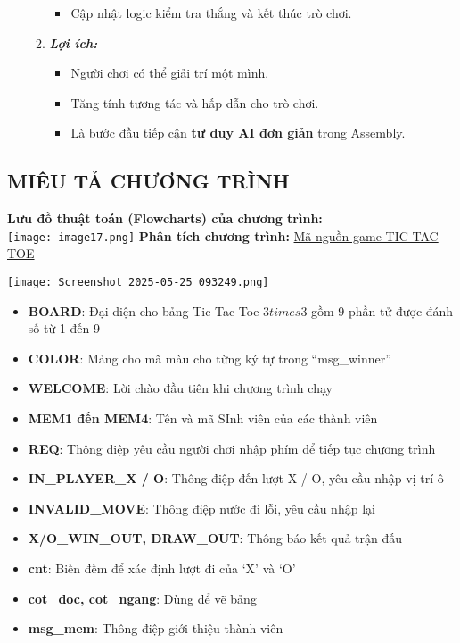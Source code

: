 \begin{enumerate}
\begin{enumerate}[label=\alph*]
\begin{itemize}
            \item Cập nhật logic kiểm tra thắng và kết thúc trò chơi.
        \end{itemize} 
        \item \textbf{\textit{Lợi ích:}}
        \begin{itemize}
            \item Người chơi có thể giải trí một mình.
            \item Tăng tính tương tác và hấp dẫn cho trò chơi.
            \item Là bước đầu tiếp cận \textbf{tư duy AI đơn giản} trong Assembly.
        \end{itemize}         
    \end{enumerate}
\end{enumerate}


\subsection*{\textbf{\large MIÊU TẢ CHƯƠNG TRÌNH}}

\textbf{Lưu đồ thuật toán (Flowcharts) của chương trình:}\\
\texttt{[image: image17.png]}
\textbf{Phân tích chương trình: }\href{https://ideone.com/sVtGtK}{Mã nguồn game TIC TAC TOE}

\texttt{[image: Screenshot 2025-05-25 093249.png]}
\begin{itemize}
    \item \textbf{BOARD}: Đại diện cho bảng Tic Tac Toe 3$times$3 gồm 9 phần tử được đánh số từ 1 đến 9 
    \item \textbf{COLOR}: Mảng cho mã màu cho từng ký tự trong “msg\_winner” 
    \item \textbf{WELCOME}: Lời chào đầu tiên khi chương trình chạy
    \item \textbf{MEM1 đến MEM4}: Tên và mã SInh viên của các thành viên
    \item \textbf{REQ}: Thông điệp yêu cầu người chơi nhập phím để tiếp tục chương trình 
    \item \textbf{IN\_PLAYER\_X / O}: Thông điệp đến lượt X / O, yêu cầu nhập vị trí ô 
    \item \textbf{INVALID\_MOVE}: Thông điệp nước đi lỗi, yêu cầu nhập lại
    \item \textbf{X/O\_WIN\_OUT, DRAW\_OUT}: Thông báo kết quả trận đấu
    \item \textbf{cnt}: Biến đếm để xác định lượt đi của ‘X’ và ‘O’
    \item \textbf{cot\_doc, cot\_ngang}: Dùng để vẽ bảng
    \item \textbf{msg\_mem}: Thông điệp giới thiệu thành viên 
\end{itemize}

